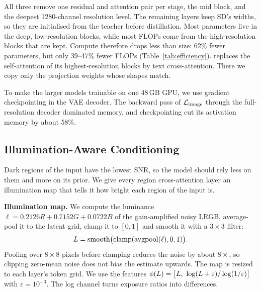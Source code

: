 All three remove one residual and attention pair per stage, the mid block, and the deepest
1280-channel resolution level. The remaining layers keep SD's widths, so they are initialised
from the teacher before distillation. Most parameters live in the deep, low-resolution blocks,
while most FLOPs come from the high-resolution blocks that are kept. Compute therefore drops less
than size: 62\% fewer parameters, but only 39--47\% fewer FLOPs (Table~\ref{tab:efficiency}).
\sdxs{} replaces the self-attention of its highest-resolution blocks by text cross-attention.
There we copy only the projection weights whose shapes match.

To make the larger models trainable on one 48\,GB GPU, we use gradient checkpointing in the
VAE decoder. The backward pass of $\mathcal{L}_{\mathrm{image}}$ through the full-resolution decoder dominated memory,
and checkpointing cut its activation memory by about 58\%.

\subsection{Illumination-Aware Conditioning}
\label{sec:illum}

Dark regions of the input have the lowest SNR, so the model should rely less on them and more
on its prior. We give every region cross-attention layer an illumination map that tells it how
bright each region of the input is.

\textbf{Illumination map.}
We compute the luminance $\ell = 0.2126R + 0.7152G + 0.0722B$ of the gain-amplified noisy LRGB,
average-pool it to the latent grid, clamp it to $[0,1]$ and smooth it with a $3\times3$ filter:
\begin{equation}
  L = \mathrm{smooth}\big(\mathrm{clamp}(\mathrm{avgpool}(\ell), 0, 1)\big).
\end{equation}
Pooling over $8\times8$ pixels before clamping reduces the noise by about $8\times$, so clipping
zero-mean noise does not bias the estimate upwards. The map is resized to each layer's token grid.
We use the features
$\phi(\illum) = \big[\illum,\ \log(\illum+\varepsilon)/\log(1/\varepsilon)\big]$ with
$\varepsilon = 10^{-3}$. The log channel turns exposure ratios into differences.


